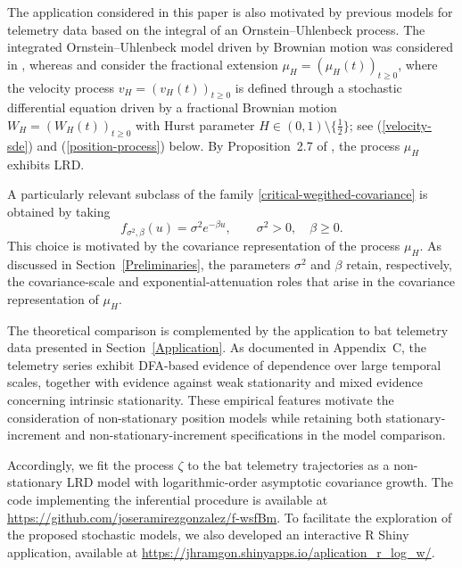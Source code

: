 \documentclass[preprint,12pt,authoryear]{elsarticle}
\begin{document}
The application considered in this paper is also motivated by previous
models for telemetry data based on the integral of an
Ornstein--Uhlenbeck process. The integrated Ornstein--Uhlenbeck model driven by Brownian motion was considered in \cite{John}, whereas
\cite{JY} and \cite{RCMS24} consider the fractional extension
$\mu_H=(\mu_H(t))_{t\geq 0}$, where the velocity process
$v_H=(v_H(t))_{t\geq 0}$ is defined through a stochastic differential
equation driven by a fractional Brownian motion
$W_H=(W_H(t))_{t\geq 0}$ with Hurst parameter
$H\in(0,1)\setminus\{\frac{1}{2}\}$; see
(\ref{velocity-sde}) and (\ref{position-process}) below.
By Proposition~2.7 of \cite{RCMS24}, the process $\mu_H$ exhibits LRD.




A particularly relevant subclass of the family
\eqref{critical-wegithed-covariance} is obtained by taking
\[
f_{\sigma^2,\beta}(u)=\sigma^2e^{-\beta u},
\qquad \sigma^2>0,\quad \beta\ge0.
\]
This choice is motivated by the covariance representation of the process $\mu_H$.
As discussed in Section~\ref{Preliminaries}, the parameters $\sigma^2$
and $\beta$ retain, respectively, the covariance-scale and
exponential-attenuation roles that arise in the covariance representation
of $\mu_H$.

The theoretical comparison is complemented by the application to bat
telemetry data presented in Section~\ref{Application}. As documented in
Appendix~C, the telemetry series exhibit DFA-based evidence of
dependence over large temporal scales, together with evidence against weak
stationarity and mixed evidence concerning intrinsic stationarity. These
empirical features motivate the consideration of non-stationary position
models while retaining both stationary-increment and non-stationary-increment
specifications in the model comparison.

Accordingly, we fit the process $\zeta$ to the bat telemetry trajectories
as a non-stationary LRD model with logarithmic-order asymptotic covariance
growth. The code implementing the inferential procedure is available at
\url{https://github.com/joseramirezgonzalez/f-wsfBm}. To facilitate the
exploration of the proposed stochastic models, we also developed an
interactive R Shiny application, available at
\url{https://jhramgon.shinyapps.io/aplication_r_log_w/}.
\end{document}
